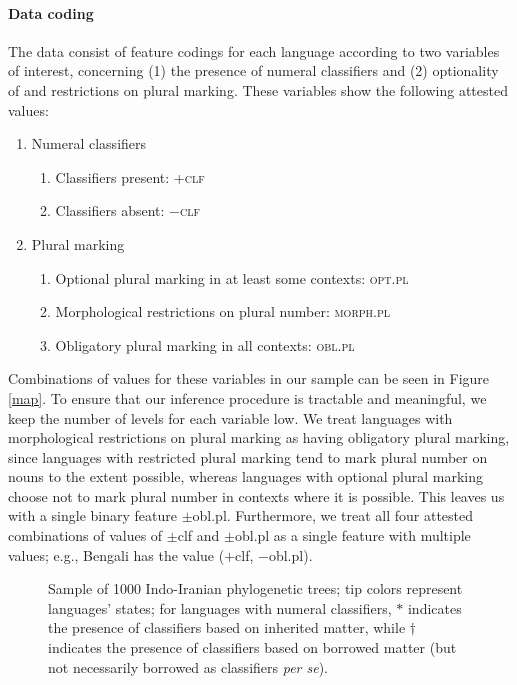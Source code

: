 \documentclass[11pt]{article}
\begin{document}
\paragraph{Data coding}
The data consist of feature codings for each language according to two variables of interest, concerning (1) the presence of numeral classifiers
and
(2) optionality of and restrictions on plural marking.
These variables show the following attested values:
\begin{enumerate}
\item Numeral classifiers
\begin{enumerate}
\item Classifiers present: +\textsc{clf}
\item Classifiers absent: $-$\textsc{clf}
\end{enumerate}
\item Plural marking
\begin{enumerate}
\item Optional plural marking in at least some contexts: \textsc{opt.pl}
\item Morphological restrictions on plural number: \textsc{morph.pl}
\item Obligatory plural marking in all contexts: \textsc{obl.pl}
\end{enumerate}
\end{enumerate}
Combinations of values for these variables in our sample can be seen in Figure \ref{map}.
To ensure that our inference procedure is tractable and meaningful, we keep the number of levels for each variable low. 
We treat languages with morphological restrictions on plural marking as having obligatory plural marking, since languages with restricted plural marking tend to mark plural number on nouns to the extent possible, whereas languages with optional plural marking choose not to mark plural number in contexts where it is possible. This leaves us with a single binary feature {\sc $\pm$obl.pl}. 
Furthermore, we treat all four attested combinations of values of {\sc $\pm$clf} and {\sc $\pm$obl.pl} as a single feature with multiple values; e.g., Bengali has the value {\sc ($+$clf, $-$obl.pl)}.


\begin{figure}
\centering
\caption{Sample of 1000 Indo-Iranian phylogenetic trees; tip colors represent languages' states; for languages with numeral classifiers, $*$ indicates the presence of classifiers based on inherited matter, while $\dagger$ indicates the presence of classifiers based on borrowed matter (but not necessarily borrowed as classifiers {\it per se}).}
\end{figure}
\end{document}
